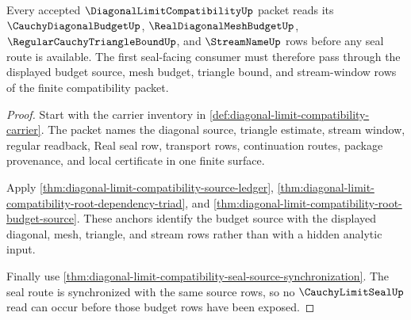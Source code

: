 \begin{theorem}
\label{thm:diagonal-limit-compatibility-budget-source-lock}
Every accepted $\DiagonalLimitCompatibilityUp$ packet reads its $\CauchyDiagonalBudgetUp$, $\RealDiagonalMeshBudgetUp$, $\RegularCauchyTriangleBoundUp$, and $\StreamNameUp$ rows before any seal route is available. The first seal-facing consumer must therefore pass through the displayed budget source, mesh budget, triangle bound, and stream-window rows of the finite compatibility packet.
\end{theorem}
\begin{proof}
Start with the carrier inventory in \autoref{def:diagonal-limit-compatibility-carrier}. The packet names the diagonal source, triangle estimate, stream window, regular readback, Real seal row, transport rows, continuation routes, package provenance, and local certificate in one finite surface.

Apply \autoref{thm:diagonal-limit-compatibility-source-ledger}, \autoref{thm:diagonal-limit-compatibility-root-dependency-triad}, and \autoref{thm:diagonal-limit-compatibility-root-budget-source}. These anchors identify the budget source with the displayed diagonal, mesh, triangle, and stream rows rather than with a hidden analytic input.

Finally use \autoref{thm:diagonal-limit-compatibility-seal-source-synchronization}. The seal route is synchronized with the same source rows, so no $\CauchyLimitSealUp$ read can occur before those budget rows have been exposed.
\end{proof}

